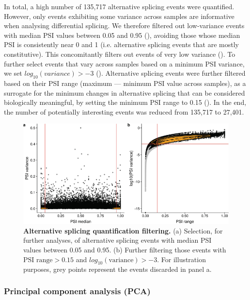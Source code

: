 In total, a high number of 135,717 alternative splicing events were quantified. However, only events exhibiting some variance across samples are informative when analysing differential splicing. We therefore filtered out low-variance events with median PSI values between 0.05 and 0.95 (), avoiding those whose median PSI is consistently near 0 and 1 (i.e. alternative splicing events that are mostly constitutive). This concomitantly filters out events of very low variance (). To further select events that vary across samples based on a minimum PSI variance, we set $log_{10}(variance) > -3$ (). Alternative splicing events were further filtered based on their PSI range (maximum — minimum PSI value across samples), as a surrogate for the minimum changes in alternative splicing that can be considered biologically meaningful, by setting the minimum PSI range to 0.15 (). In the end, the number of potentially interesting events was reduced from 135,717 to 27,401.

\begin{figure}[!h]
  \includegraphics[width=.8\textwidth]{images/psichomics/4-psi-filtering}
  \centering
  \caption[Alternative splicing quantification filtering]{\textbf{Alternative splicing quantification filtering.} (a) Selection, for further analyses, of alternative splicing events with median PSI values between 0.05 and 0.95. (b) Further filtering those events with $\textrm{PSI range} > 0.15$ and $log_{10}(\textrm{variance}) > -3$. For illustration purposes, grey points represent the events discarded in panel a.}
  \label{fig:psichomics-psi-filtering}
\end{figure}

\subsubsection{Principal component analysis (PCA)}


